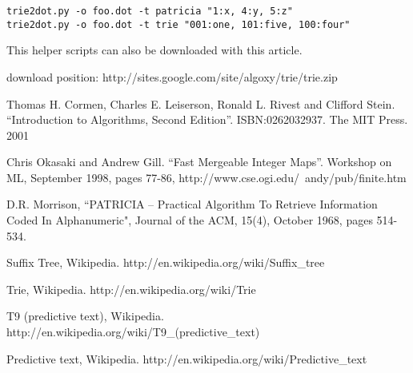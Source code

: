 \documentclass{article}
\begin{document}
\begin{verbatim}
trie2dot.py -o foo.dot -t patricia "1:x, 4:y, 5:z"
trie2dot.py -o foo.dot -t trie "001:one, 101:five, 100:four"
\end{verbatim}

This helper scripts can also be downloaded with this article.

download position: http://sites.google.com/site/algoxy/trie/trie.zip

\begin{thebibliography}{99}

Thomas H. Cormen, Charles E. Leiserson, Ronald L. Rivest and Clifford Stein. 
``Introduction to Algorithms, Second Edition''. ISBN:0262032937. The MIT Press. 2001

Chris Okasaki and Andrew Gill. ``Fast Mergeable Integer
Maps''. Workshop on ML, September 1998, pages 77-86, http://www.cse.ogi.edu/~andy/pub/finite.htm

D.R. Morrison, ``PATRICIA -- Practical Algorithm To Retrieve  Information Coded In Alphanumeric", Journal of the ACM, 15(4), October 1968, pages 514-534.

Suffix Tree, Wikipedia. http://en.wikipedia.org/wiki/Suffix\_tree

Trie, Wikipedia. http://en.wikipedia.org/wiki/Trie

T9 (predictive text), Wikipedia. http://en.wikipedia.org/wiki/T9\_(predictive\_text)

Predictive text, Wikipedia. http://en.wikipedia.org/wiki/Predictive\_text

\end{thebibliography}

\ifx\wholebook\relax\else
\end{document}
